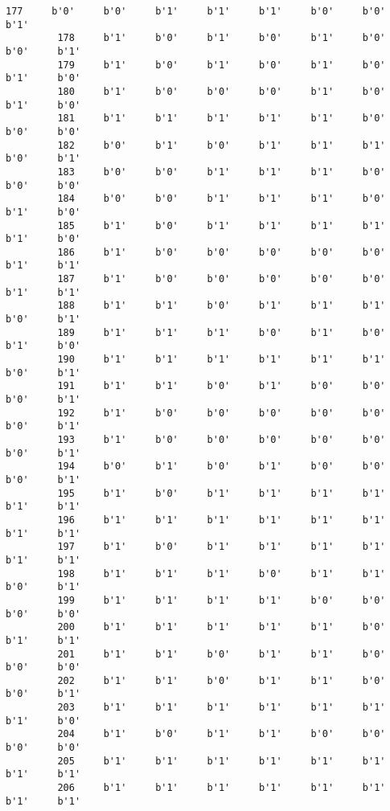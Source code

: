 \documentclass[11pt]{article}
\begin{document}
\begin{Verbatim}[commandchars=\\\{\}]
         177     b'0'     b'0'     b'1'     b'1'     b'1'     b'0'     b'0'     b'1'   
         178     b'1'     b'0'     b'1'     b'0'     b'1'     b'0'     b'0'     b'1'   
         179     b'1'     b'0'     b'1'     b'0'     b'1'     b'0'     b'1'     b'0'   
         180     b'1'     b'0'     b'0'     b'0'     b'1'     b'0'     b'1'     b'0'   
         181     b'1'     b'1'     b'1'     b'1'     b'1'     b'0'     b'0'     b'0'   
         182     b'0'     b'1'     b'0'     b'1'     b'1'     b'1'     b'0'     b'1'   
         183     b'0'     b'0'     b'1'     b'1'     b'1'     b'0'     b'0'     b'0'   
         184     b'0'     b'0'     b'1'     b'1'     b'1'     b'0'     b'1'     b'0'   
         185     b'1'     b'0'     b'1'     b'1'     b'1'     b'1'     b'1'     b'0'   
         186     b'1'     b'0'     b'0'     b'0'     b'0'     b'0'     b'1'     b'1'   
         187     b'1'     b'0'     b'0'     b'0'     b'0'     b'0'     b'1'     b'1'   
         188     b'1'     b'1'     b'0'     b'1'     b'1'     b'1'     b'0'     b'1'   
         189     b'1'     b'1'     b'1'     b'0'     b'1'     b'0'     b'1'     b'0'   
         190     b'1'     b'1'     b'1'     b'1'     b'1'     b'1'     b'0'     b'1'   
         191     b'1'     b'1'     b'0'     b'1'     b'0'     b'0'     b'0'     b'1'   
         192     b'1'     b'0'     b'0'     b'0'     b'0'     b'0'     b'0'     b'1'   
         193     b'1'     b'0'     b'0'     b'0'     b'0'     b'0'     b'0'     b'1'   
         194     b'0'     b'1'     b'0'     b'1'     b'0'     b'0'     b'0'     b'1'   
         195     b'1'     b'0'     b'1'     b'1'     b'1'     b'1'     b'1'     b'1'   
         196     b'1'     b'1'     b'1'     b'1'     b'1'     b'1'     b'1'     b'1'   
         197     b'1'     b'0'     b'1'     b'1'     b'1'     b'1'     b'1'     b'1'   
         198     b'1'     b'1'     b'1'     b'0'     b'1'     b'1'     b'0'     b'1'   
         199     b'1'     b'1'     b'1'     b'1'     b'0'     b'0'     b'0'     b'0'   
         200     b'1'     b'1'     b'1'     b'1'     b'1'     b'0'     b'1'     b'1'   
         201     b'1'     b'1'     b'0'     b'1'     b'1'     b'0'     b'0'     b'0'   
         202     b'1'     b'1'     b'0'     b'1'     b'1'     b'0'     b'0'     b'1'   
         203     b'1'     b'1'     b'1'     b'1'     b'1'     b'1'     b'1'     b'0'   
         204     b'1'     b'0'     b'1'     b'1'     b'0'     b'0'     b'0'     b'0'   
         205     b'1'     b'1'     b'1'     b'1'     b'1'     b'1'     b'1'     b'1'   
         206     b'1'     b'1'     b'1'     b'1'     b'1'     b'1'     b'1'     b'1'   

\end{Verbatim}
\end{document}
